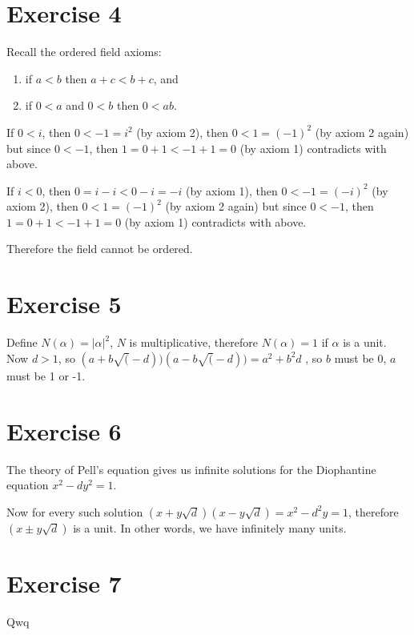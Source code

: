 \documentclass{article}
\begin{document}
\section*{Exercise 4}
Recall the ordered field axioms:

\begin{enumerate}
    \item if $ a < b $ then $ a + c < b + c $, and 
    \item if $ 0 < a $ and $ 0 < b $ then $ 0 < ab $.
\end{enumerate}

If $ 0 < i $, then $ 0 < -1 = i^2 $ (by axiom 2), then $ 0 < 1 = (-1)^2 $ (by axiom 2 again)
but since $ 0 < -1 $, then $ 1 = 0 + 1 < -1 + 1 = 0 $ (by axiom 1) contradicts with above.

If $ i < 0 $, then $ 0 = i - i < 0 - i = -i $ (by axiom 1), then $ 0 < -1 = (-i)^2 $ (by axiom 2), then $ 0 < 1 = (-1)^2 $ (by axiom 2 again)
but since $ 0 < -1 $, then $ 1 = 0 + 1 < -1 + 1 = 0 $ (by axiom 1) contradicts with above.

Therefore the field cannot be ordered.

\section*{Exercise 5}

Define $ N(\alpha) = |\alpha|^2 $, $ N $ is multiplicative, therefore $ N(\alpha) = 1 $ if $ \alpha $ is a unit. Now $ d > 1 $, so $ (a + b\sqrt(-d))(a - b\sqrt(-d)) = a^2 + b^2d $ , so $ b $ must be 0, $ a $ must be 1 or -1.

\section*{Exercise 6}

The theory of Pell's equation gives us infinite solutions for the Diophantine equation $ x^2 - dy^2 = 1 $.

Now for every such solution $ (x + y \sqrt{d})(x - y \sqrt{d}) = x^2 - d^2y = 1 $, therefore $ (x \pm y \sqrt{d}) $ is a unit. In other words, we have infinitely many units.

\section*{Exercise 7}
Qwq
\end{document}
